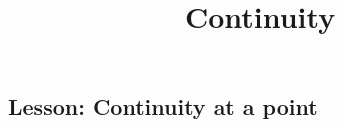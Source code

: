 \documentclass{ximera}
\title{Continuity}
\begin{document}
\begin{abstract}
\end{abstract}

\maketitle

\subsection{Lesson: Continuity at a point}

\begin{center}
\end{center}
\end{document}
